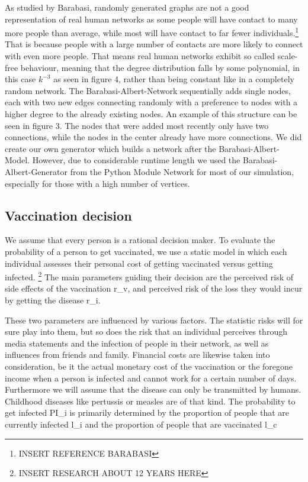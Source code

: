 \documentclass[11pt]{article}
\begin{document}
As studied by Barabasi, randomly generated graphs are not a good representation of real human networks as some people will have contact to many more people than average, while most will have contact to far fewer individuals.\footnote{INSERT REFERENCE BARABASI} That is because people with a large number of contacts are more likely to connect with even more people. That means real human networks exhibit so called scale-free behaviour, meaning that the degree distribution falls by some polynomial, in this case $k^{-3}$ as seen in figure 4, rather than being constant like in a completely random network.  The Barabasi-Albert-Network sequentially adds single nodes, each with two new edges connecting randomly with a preference to nodes with a higher degree to the already existing nodes. An example of this structure can be seen in figure 3. The nodes that were added most recently only have two connections, while the nodes in the center already have more connections. We did create our own generator which builds a network after the Barabasi-Albert-Model. However, due to considerable runtime length we used the Barabasi-Albert-Generator from the Python Module Network for most of our simulation, especially for those with a high number of vertices.
\vspace{14px}




\subsection{Vaccination decision}

We assume that every person is a rational decision maker. To evaluate the probability of a person to get vaccinated, we use a static model in which each individual assesses their personal cost of getting vaccinated versus getting infected.  \footnote{INSERT RESEARCH ABOUT 12 YEARS HERE}  The main parameters guiding their decision are the perceived risk of side effects of the vaccination r\_v, and perceived risk of the loss they would incur by getting the disease r\_i.

These two parameters are influenced by various factors. The statistic risks will for sure play into them, but so does the risk that an individual perceives through media statements and
the infection of people in their network, as well as influences from friends and family. Financial costs are likewise taken into consideration, be it the actual monetary cost of the vaccination or the foregone income when a person is infected and cannot work for a certain number of days. Furthermore we will assume that the disease can only be transmitted by humans. Childhood diseases like pertussis or measles are of that kind. 
The probability to get infected PI\_i is primarily determined by the proportion of people that are currently infected l\_i and the proportion of people that are vaccinated l\_c
\end{document}
